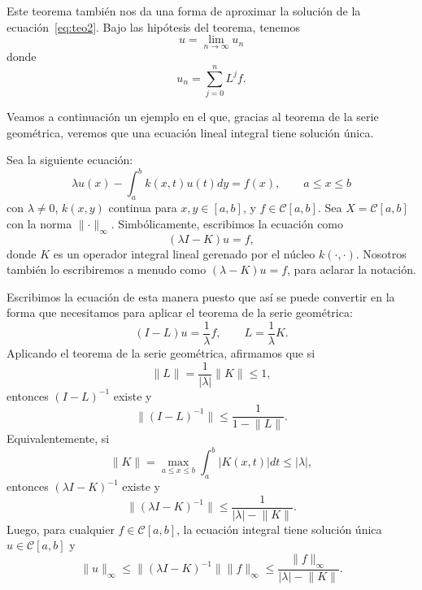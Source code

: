 \begin{observacion}
	Este teorema también nos da una forma de aproximar la solución de la ecuación~\eqref{eq:teo2}. Bajo las hipótesis del teorema, tenemos
	\begin{equation}
		u = \lim_{n \rightarrow \infty}u_n
	\end{equation}
	donde
	\begin{equation}
		u_n = \sum_{j=0}^{n}L^jf.
	\end{equation}
\end{observacion}
Veamos a continuación un ejemplo en el que, gracias al teorema de la serie geométrica, veremos que una ecuación lineal integral tiene solución única.
\begin{ejemplo}\label{ej:1}
	Sea la siguiente ecuación:
	\begin{equation}
		\lambda u(x) - \int_{a}^{b}k(x,t)u(t)dy = f(x), \qquad a \leqslant x \leqslant b
	\end{equation}
	con $\lambda \neq 0$, $k(x,y)$ continua para $x,y \in [a,b]$, y $f \in \mathcal{C}[a,b]$. Sea $X = \mathcal{C}[a,b]$ con la norma $\lVert \cdot \rVert_\infty$. Simbólicamente, escribimos la ecuación como
	\begin{equation}
		(\lambda I-K)u = f,
	\end{equation}
	donde $K$ es un operador integral lineal gerenado por el núcleo $k(\cdot , \cdot )$. Nosotros también lo escribiremos a menudo como $(\lambda - K)u = f$, para aclarar la notación.
	
	Escribimos la ecuación de esta manera puesto que así se puede convertir en la forma que necesitamos para aplicar el teorema de la serie geométrica:
	\begin{equation}
		(I-L)u = \dfrac{1}{\lambda}f, \qquad L = \dfrac{1}{\lambda}K.
	\end{equation}
	Aplicando el teorema de la serie geométrica, afirmamos que si
	\begin{equation}
		\lVert L \rVert = \dfrac{1}{|\lambda |}\lVert K \rVert \leq 1,
	\end{equation}
	entonces $(I-L)^{-1}$ existe y
	\begin{equation}
		\lVert(I-L)^{-1}\rVert \leqslant \dfrac{1}{1 - \lVert L \rVert}.
	\end{equation}
	Equivalentemente, si
	\begin{equation}
		\lVert K \rVert = \max_{a\leqslant x\leqslant b}\int_{a}^{b}|K(x,t)|dt \leq |\lambda|,
	\end{equation}
	entonces $(\lambda I - K)^{-1}$ existe y 
	\begin{equation}
		\lVert (\lambda I - K)^{-1}\rVert \leqslant \dfrac{1}{|\lambda| - \lVert K \rVert }.
	\end{equation}
	Luego, para cualquier $f \in \mathcal{C}[a,b]$, la ecuación integral tiene solución única $u \in \mathcal{C}[a,b]$ y 
	\begin{equation}
		\lVert u \rVert_\infty \leqslant \lVert (\lambda I - K)^{-1} \rVert \lVert f \rVert_\infty \leqslant \dfrac{\lVert f \rVert_\infty}{|\lambda| - \lVert K \rVert }.
	\end{equation}
\end{ejemplo}
